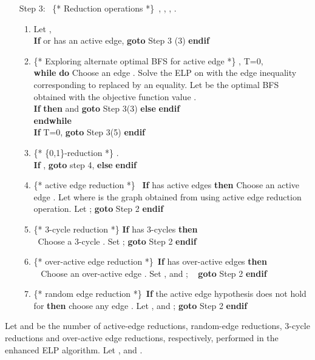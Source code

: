 \documentclass[12pt]{article}
\begin{document}
\begin{itemize}
\item[Step 3:~] \{* \textsf{Reduction operations}
*\}\ ,  , , .
\begin{enumerate}
\item Let ,\\\textbf{If}  or  has an
active edge, \textbf{goto} Step 3 (3) \textbf{endif}
 \item \{*
\textsf{Exploring alternate optimal BFS for active edge} *\}
, T=0,\\
\textbf{while}  \textbf{do}
Choose an edge .
Solve the ELP on  with the edge inequality corresponding to
 replaced by an equality. Let  be the optimal
BFS obtained with the objective function value .\\
\textbf{If}  \textbf{then}  and \textbf{goto} Step 3(3)
\textbf{else}  \textbf{endif} \\ \textbf{endwhile}\\
\textbf{If} T=0, \textbf{goto} Step 3(5) \textbf{endif}\item \{*
\textsf{\{0,1\}-reduction} *\}  .\\
\textbf{If} , \textbf{goto}
step 4, \textbf{else}   \textbf{endif}
\item \{* \textsf{active edge reduction} *\}  \ \textbf{If}  has active edges \textbf{then} Choose an active
edge . Let  where  is the
graph obtained from  using  active edge reduction operation.
Let ;  \textbf{goto} Step 2 \textbf{endif}
\item \{* \textsf{3-cycle reduction} *\} \textbf{If}  has 3-cycles \textbf{then} \\
     \mbox{ }Choose a 3-cycle . Set ;
      \textbf{goto} Step 2 \textbf{endif}
\item \{* \textsf{over-active edge reduction} *\}\ \textbf{If}  has over-active edges \textbf{then} \\
     \mbox{ } Choose an over-active edge . Set , and ;
     \mbox{ }  \textbf{goto} Step 2 \textbf{endif}
\item \{* \textsf{random edge reduction} *\}\ \textbf{If} the active
edge hypothesis does not hold for  \textbf{then} choose
any edge .
Let , and ;  \textbf{goto} Step 2 \textbf{endif}
\end{enumerate}
\end{itemize}

Let  and  be the
number of active-edge reductions, random-edge reductions, 3-cycle reductions and over-active edge reductions,
 respectively,  performed in the enhanced ELP
 algorithm. Let ,  and .
\end{document}
